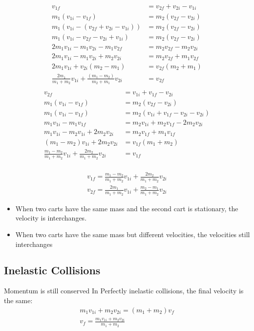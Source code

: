 \documentclass{article}
\theoremstyle{mytheoremstyle}
\theoremstyle{mytheoremstyle}
\theoremstyle{myproblemstyle}
\begin{document}
    \begin{align*}
        v_{1f} &= v_{2f} + v_{2i} -v_{1i}  \\
        m_1(v_{1i}-v_{1f}) &= m_2(v_{2f}-v_{2i}) \\
        m_1(v_{1i}-(v_{2f} + v_{2i} -v_{1i})) &= m_2(v_{2f}-v_{2i}) \\
        m_1(v_{1i}-v_{2f} - v_{2i} +v_{1i}) &= m_2(v_{2f}-v_{2i}) \\
        2m_1v_{1i} - m_1v_{2i} - m_1 v_{2f} &= m_2v_{2f}-m_2v_{2i} \\
        2m_1v_{1i} - m_1v_{2i} + m_2v_{2i} &= m_2v_{2f} + m_1 v_{2f} \\
        2m_1v_{1i} + v_{2i} (m_2-m_1) &= v_{2f} (m_2 + m_1) \\
        \frac{2m_1}{m_1 + m_2} v_{1i} + \frac{(m_1-m_2)}{m_2 + m_1} v_{2i} &= v_{2f} \\
    \end{align*}
    \begin{align*}
        v_{2f} &= v_{1i} + v_{1f} -v_{2i} \\
        m_1(v_{1i}-v_{1f}) &= m_2(v_{2f}-v_{2i}) \\
        m_1(v_{1i}-v_{1f}) &= m_2(v_{1i} + v_{1f} -v_{2i}-v_{2i}) \\
        m_1v_{1i}-m_1v_{1f} &= m_2v_{1i} + m_2v_{1f} -2m_2v_{2i} \\
        m_1v_{1i} - m_2v_{1i} + 2m_2v_{2i} &=  m_2v_{1f}  + m_1v_{1f} \\
        (m_1 - m_2)v_{1i} + 2m_2v_{2i} &=  v_{1f}(m_1  + m_2) \\
        \frac{m_1 - m_2}{m_1  + m_2} v_{1i} + \frac{2m_2}{m_1  + m_2}v_{2i} &=  v_{1f} \\
    \end{align*}

    \begin{align*}
        v_{1f}= \frac{m_1-m_2}{m_1+m_2} v_{1i} + \frac{2m_2}{m_1+m_2} v_{2i} \\
        v_{2f}= \frac{2m_1}{m_1+m_2} v_{1i} + \frac{m_2-m_1}{m_1+m_2} v_{2i}
    \end{align*}

    \begin{itemize}
        \item When two carts have the same mass and the second cart is
            stationary, the velocity is interchanges.

        \item When two carts have the same mass but different velocities, the
            velocities still interchanges
    \end{itemize}

    \subsection*{Inelastic Collisions}
    Momentum is still conserved In Perfectly inelastic collisions, the final
    velocity is the same:
    \begin{align*}
        m_1 v_{1i} + m_2 v_{2i} = (m_1 + m_2) v_f \\
        v_f = \frac{m_1 v_{1i} + m_2 v_{2i}}{m_1 + m_2}
    \end{align*}
\end{document}
